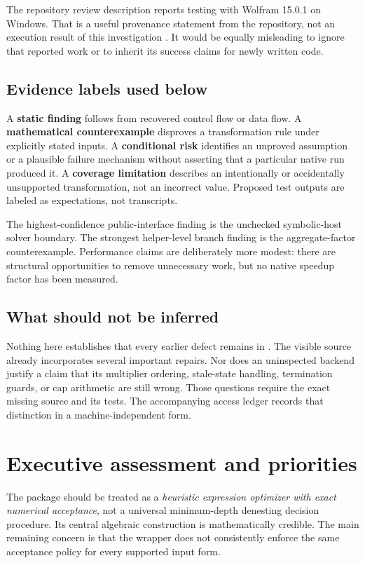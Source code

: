 \documentclass[11pt,letterpaper]{article}
\numberwithin{equation}{section}
\theoremstyle{definition}\newtheorem{definition}[theorem]{Definition}
\theoremstyle{remark}\newtheorem{remark}[theorem]{Remark}
\newcommand{\code}[1]{\texttt{\detokenize{#1}}}
\begin{document}
The repository review description reports testing with Wolfram 15.0.1 on Windows. That is a useful provenance statement from the repository, not an execution result of this investigation \cite{repo-review}. It would be equally misleading to ignore that reported work or to inherit its success claims for newly written code.

\subsection{Evidence labels used below}
A \textbf{static finding} follows from recovered control flow or data flow. A \textbf{mathematical counterexample} disproves a transformation rule under explicitly stated inputs. A \textbf{conditional risk} identifies an unproved assumption or a plausible failure mechanism without asserting that a particular native run produced it. A \textbf{coverage limitation} describes an intentionally or accidentally unsupported transformation, not an incorrect value. Proposed test outputs are labeled as expectations, not transcripts.

The highest-confidence public-interface finding is the unchecked symbolic-host solver boundary. The strongest helper-level branch finding is the aggregate-factor counterexample. Performance claims are deliberately more modest: there are structural opportunities to remove unnecessary work, but no native speedup factor has been measured.

\subsection{What should not be inferred}
Nothing here establishes that every earlier defect remains in \code{StradFixed}. The visible source already incorporates several important repairs. Nor does an uninspected backend justify a claim that its multiplier ordering, stale-state handling, termination guards, or cap arithmetic are still wrong. Those questions require the exact missing source and its tests. The accompanying access ledger records that distinction in a machine-independent form.

\section{Executive assessment and priorities}
\label{sec:priorities}
The package should be treated as a \emph{heuristic expression optimizer with exact numerical acceptance}, not a universal minimum-depth denesting decision procedure. Its central algebraic construction is mathematically credible. The main remaining concern is that the wrapper does not consistently enforce the same acceptance policy for every supported input form.
\end{document}
